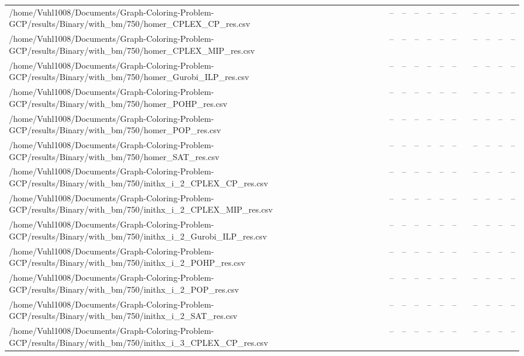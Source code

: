 \begin{table}[htbp]
\begin{tabular}{llllllllllll}
/home/Vuhl1008/Documents/Graph-Coloring-Problem-GCP/results/Binary/with\_bm/750/homer\_CPLEX\_CP\_res.csv & -- & -- & -- & -- & -- & -- & {} & -- & -- & -- & -- \\
/home/Vuhl1008/Documents/Graph-Coloring-Problem-GCP/results/Binary/with\_bm/750/homer\_CPLEX\_MIP\_res.csv & -- & -- & -- & -- & -- & -- & {} & -- & -- & -- & -- \\
/home/Vuhl1008/Documents/Graph-Coloring-Problem-GCP/results/Binary/with\_bm/750/homer\_Gurobi\_ILP\_res.csv & -- & -- & -- & -- & -- & -- & {} & -- & -- & -- & -- \\
/home/Vuhl1008/Documents/Graph-Coloring-Problem-GCP/results/Binary/with\_bm/750/homer\_POHP\_res.csv & -- & -- & -- & -- & -- & -- & {} & -- & -- & -- & -- \\
/home/Vuhl1008/Documents/Graph-Coloring-Problem-GCP/results/Binary/with\_bm/750/homer\_POP\_res.csv & -- & -- & -- & -- & -- & -- & {} & -- & -- & -- & -- \\
/home/Vuhl1008/Documents/Graph-Coloring-Problem-GCP/results/Binary/with\_bm/750/homer\_SAT\_res.csv & -- & -- & -- & -- & -- & -- & {} & -- & -- & -- & -- \\
/home/Vuhl1008/Documents/Graph-Coloring-Problem-GCP/results/Binary/with\_bm/750/inithx\_i\_2\_CPLEX\_CP\_res.csv & -- & -- & -- & -- & -- & -- & {} & -- & -- & -- & -- \\
/home/Vuhl1008/Documents/Graph-Coloring-Problem-GCP/results/Binary/with\_bm/750/inithx\_i\_2\_CPLEX\_MIP\_res.csv & -- & -- & -- & -- & -- & -- & {} & -- & -- & -- & -- \\
/home/Vuhl1008/Documents/Graph-Coloring-Problem-GCP/results/Binary/with\_bm/750/inithx\_i\_2\_Gurobi\_ILP\_res.csv & -- & -- & -- & -- & -- & -- & {} & -- & -- & -- & -- \\
/home/Vuhl1008/Documents/Graph-Coloring-Problem-GCP/results/Binary/with\_bm/750/inithx\_i\_2\_POHP\_res.csv & -- & -- & -- & -- & -- & -- & {} & -- & -- & -- & -- \\
/home/Vuhl1008/Documents/Graph-Coloring-Problem-GCP/results/Binary/with\_bm/750/inithx\_i\_2\_POP\_res.csv & -- & -- & -- & -- & -- & -- & {} & -- & -- & -- & -- \\
/home/Vuhl1008/Documents/Graph-Coloring-Problem-GCP/results/Binary/with\_bm/750/inithx\_i\_2\_SAT\_res.csv & -- & -- & -- & -- & -- & -- & {} & -- & -- & -- & -- \\
/home/Vuhl1008/Documents/Graph-Coloring-Problem-GCP/results/Binary/with\_bm/750/inithx\_i\_3\_CPLEX\_CP\_res.csv & -- & -- & -- & -- & -- & -- & {} & -- & -- & -- & -- \\

\end{tabular}
\end{table}
